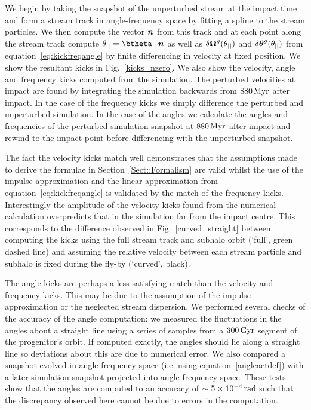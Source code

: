 \documentclass[useAMS,usenatbib,fleqn,a4paper]{mn2e}
\def\rad{\,\rm rad}
\def\Gyr{\,{\rm Gyr}}
\def\Myr{\,{\rm Myr}}
\newcommand{\bs}[1]{\bmath{#1}}
\begin{document}
We begin by taking the snapshot of the unperturbed stream at the impact time and form a stream track in angle-frequency space by fitting a spline to the stream particles. We then compute the vector $\bs{n}$ from this track and at each point along the stream track compute $\theta_{||}=\btheta\cdot\bs{n}$ as well as $\delta\bs{\Omega}^g(\theta_{||})$ and $\delta\bs{\theta}^g(\theta_{||})$ from equation~\eqref{eq:kickfreqangle} by finite differencing in velocity at fixed position. We show the resultant kicks in Fig.~\ref{kicks_nzero}. We also show the velocity, angle and frequency kicks computed from the simulation. The perturbed velocities at impact are found by integrating the simulation backwards from $880\Myr$ after impact. In the case of the frequency kicks we simply difference the perturbed and unperturbed simulation. In the case of the angles we calculate the angles and frequencies of the perturbed simulation snapshot at $880\Myr$ after impact and rewind to the impact point before differencing with the unperturbed snapshot.

The fact the velocity kicks match well demonstrates that the assumptions made to derive the formulae in Section~\ref{Sect::Formalism} are valid whilst the use of the impulse approximation and the linear approximation from equation~\eqref{eq:kickfreqangle} is validated by the match of the frequency kicks. Interestingly the amplitude of the velocity kicks found from the numerical calculation overpredicts that in the simulation far from the impact centre. This corresponds to the difference observed in Fig.~\ref{curved_straight} between computing the kicks using the full stream track and subhalo orbit (`full', green dashed line) and assuming the relative velocity between each stream particle and subhalo is fixed during the fly-by (`curved', black).

The angle kicks are perhaps a less satisfying match than the velocity and frequency kicks. This may be due to the assumption of the impulse approximation or the neglected stream dispersion. We performed several checks of the accuracy of the angle computation: we measured the fluctuations in the angles about a straight line using a series of samples from a $300\Gyr$ segment of the progenitor's orbit. If computed exactly, the angles should lie along a straight line so deviations about this are due to numerical error. We also compared a snapshot evolved in angle-frequency space (i.e. using equation~\eqref{angleactdef}) with a later simulation snapshot projected into angle-frequency space. These tests show that the angles are computed to an accuracy of $\sim5\times10^{-4}\rad$ such that the discrepancy observed here cannot be due to errors in the computation.
\end{document}
